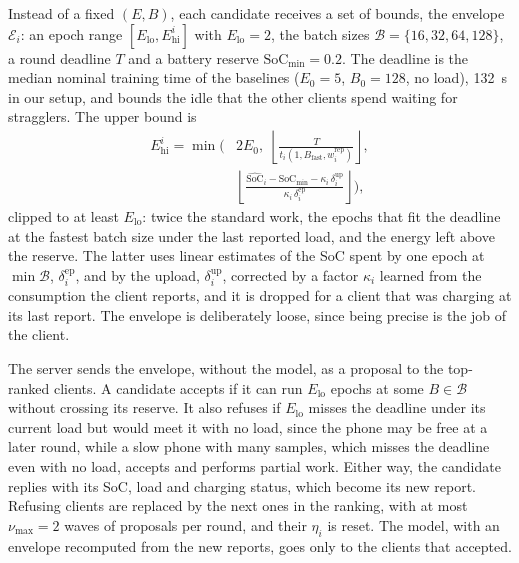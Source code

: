 Instead of a fixed $(E,B)$, each candidate receives a set of bounds, the
envelope $\mathcal{E}_i$: an epoch range $[E_{\mathrm{lo}},E_{\mathrm{hi}}^i]$ with
$E_{\mathrm{lo}}=2$, the batch sizes $\mathcal{B}=\{16,32,64,128\}$, a round
deadline $T$ and a battery reserve $\mathrm{SoC}_{\min}=0.2$. The deadline is
the median nominal training time of the baselines ($E_0=5$, $B_0=128$, no
load), 132~s in our setup, and bounds the idle that the other clients spend
waiting for stragglers. The upper bound is
\begin{equation}
  \begin{aligned}
  E_{\mathrm{hi}}^i = \min\biggl(&2E_0,\;
    \left\lfloor \frac{T}{t_i(1,B_{\mathrm{fast}},w_i^{\mathrm{rep}})} \right\rfloor,\\
  &\left\lfloor \frac{\widehat{\mathrm{SoC}}_i - \mathrm{SoC}_{\min}
    - \kappa_i\,\delta^{\mathrm{up}}_i}{\kappa_i\,\delta^{\mathrm{ep}}_i} \right\rfloor \biggr),
  \end{aligned}
  \label{eq:ehi}
\end{equation}
clipped to at least $E_{\mathrm{lo}}$: twice the standard work, the epochs that
fit the deadline at the fastest batch size under the last reported load, and
the energy left above the reserve. The latter uses linear estimates of the SoC
spent by one epoch at $\min\mathcal{B}$, $\delta^{\mathrm{ep}}_i$, and by the
upload, $\delta^{\mathrm{up}}_i$, corrected by a factor $\kappa_i$ learned
from the consumption the client reports, and it is dropped for a client that
was charging at its last report. The envelope is deliberately loose, since
being precise is the job of the client.

The server sends the envelope, without the model, as a proposal to the
top-ranked clients. A candidate accepts if it can run $E_{\mathrm{lo}}$ epochs
at some $B\in\mathcal{B}$ without crossing its reserve. It also refuses if
$E_{\mathrm{lo}}$ misses the deadline under its current load but would meet it
with no load, since the phone may be free at a later round, while a slow phone
with many samples, which misses the deadline even with no load, accepts and
performs partial work. Either way, the candidate replies with its SoC, load and
charging status, which become its new report. Refusing clients are replaced by
the next ones in the ranking, with at most $\nu_{\max}=2$ waves of proposals
per round, and their $\eta_i$ is reset. The model, with an envelope recomputed
from the new reports, goes only to the clients that accepted.

